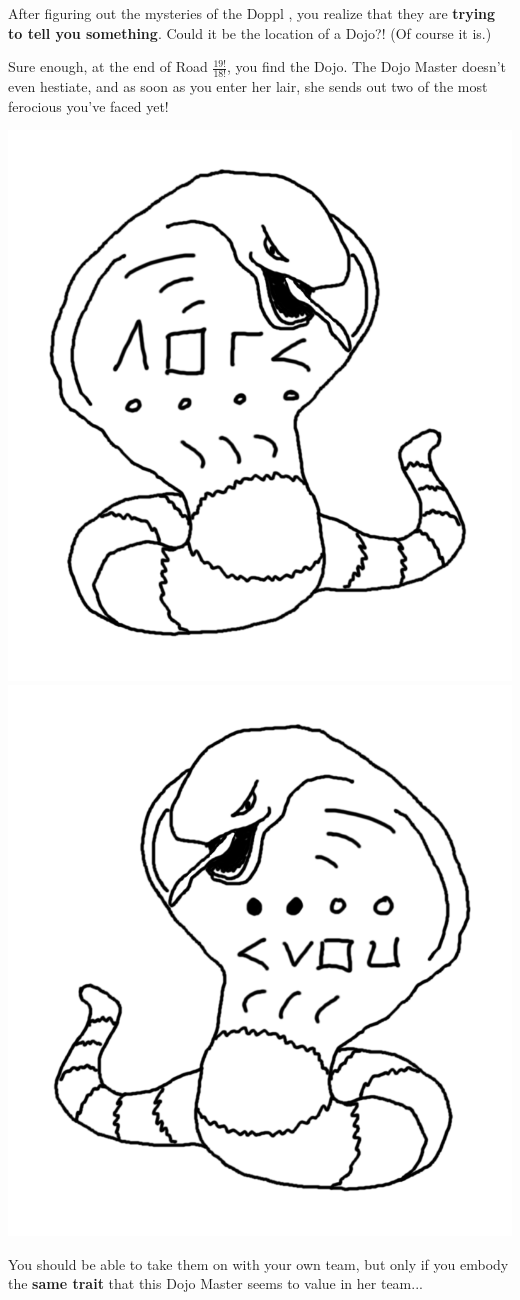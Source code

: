 

After figuring out the mysteries of the Doppl \mappMobimon{}, you realize
that they are \textbf{trying to tell you something}. Could it be the location of
a \mappMobimon{} Dojo?! (Of course it is.)

Sure enough, at the end of Road \(\frac{19!}{18!}\), you find the Dojo.
The Dojo Master doesn't even hestiate, and as soon as you enter her lair,
she sends out two of the most ferocious \mappMobimon{} you've faced yet!

\begin{center}
\includegraphics[width=0.4\linewidth]{assets/not-arbok-1.png}
\includegraphics[width=0.4\linewidth]{assets/not-arbok-2.png}
\end{center}

You should be able to take them on with your own team, but only if you
embody the \textbf{same trait} that this Dojo Master seems to value in her
team...



